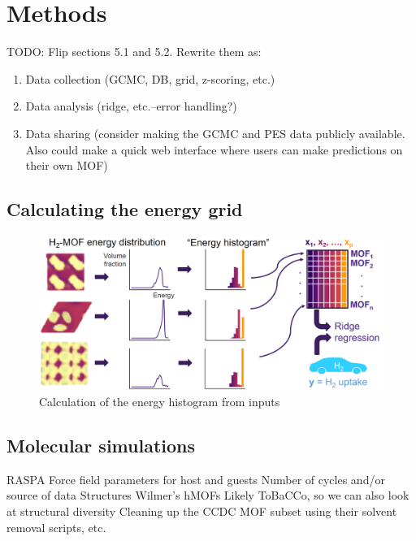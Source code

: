\documentclass[letterpaper]{article}
\begin{document}
\section{Methods}

TODO:
Flip sections 5.1 and 5.2.  Rewrite them as:
\begin{enumerate}
	\item Data collection (GCMC, DB, grid, z-scoring, etc.)
	\item Data analysis (ridge, etc.--error handling?)
	\item Data sharing (consider making the GCMC and PES data publicly available.  Also could make a quick web interface where users can make predictions on their own MOF)
\end{enumerate}

\subsection{Calculating the energy grid}

\begin{figure}[H]
	\centering
	\includegraphics[width=0.75\columnwidth]{Figs/energy_schematic.png}
	\caption{Calculation of the energy histogram from inputs}
	\label{fig:schematic}
\end{figure}


\subsection{Molecular simulations}

\begin{outline}
	\1 RASPA
	\1 Force field parameters for host and guests
	\1 Number of cycles and/or source of data
	\1 Structures
		\2 Wilmer's hMOFs
		\2 Likely ToBaCCo, so we can also look at structural diversity
		\2 Cleaning up the CCDC MOF subset using their solvent removal scripts, etc.
\end{outline}
\end{document}
